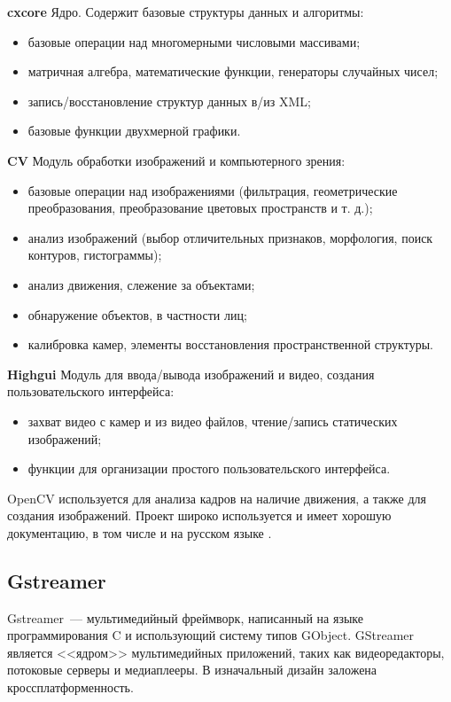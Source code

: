 \textbf{cxcore}
\smallskip
Ядро. Содержит базовые структуры данных и алгоритмы:
\smallskip
\begin{itemize}
	\item базовые операции над многомерными числовыми массивами;
	\item матричная алгебра, математические функции, генераторы случайных чисел;
	\item запись/восстановление структур данных в/из XML;
	\item базовые функции двухмерной графики.
\end{itemize}

\medskip
\textbf{CV}
\smallskip
Модуль обработки изображений и компьютерного зрения:
\smallskip
\begin{itemize}
	\item
	базовые операции над изображениями (фильтрация, геометрические преобразования,
	преобразование цветовых пространств и т. д.);
	\item
	анализ изображений (выбор отличительных признаков, морфология, поиск контуров, гистограммы);
	\item
	анализ движения, слежение за объектами;
	\item
	обнаружение объектов, в частности лиц;
	\item
	калибровка камер, элементы восстановления пространственной структуры.
\end{itemize}

\medskip
\textbf{Highgui}
Модуль для ввода/вывода изображений и видео, создания пользовательского интерфейса:
\smallskip
\begin{itemize}
	\item захват видео с камер и из видео файлов, чтение/запись статических изображений;
	\item функции для организации простого пользовательского интерфейса.
\end{itemize}

\medskip
OpenCV используется для анализа кадров на наличие движения, а также для создания изображений.
Проект широко используется и имеет хорошую документацию, в том числе и на русском языке
\cite{opencv_doc}.

\subsection{Gstreamer}
Gstreamer~--- мультимедийный фреймворк, написанный на языке программирования C и
использующий систему типов GObject. GStreamer является <<ядром>> мультимедийных приложений,
таких как видеоредакторы, потоковые серверы и медиаплееры. В изначальный дизайн заложена
кроссплатформенность.

